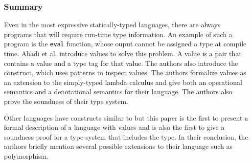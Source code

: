 \documentclass[letterpaper]{llncs}
\begin{document}
\subsubsection*{Summary}

Even in the most expressive statically-typed languages, there are always programs that will require run-time type information. An example of such a program is the \texttt{eval} function, whose ouput cannot be assigned a type at compile time. Abadi et al. introduce \Dynamic values to solve this problem. A \Dynamic value is a pair that contains a value and a type tag for that value. The authors also introduce the \typecase construct, which uses patterns to inspect \Dynamic values. The authors formalize \Dynamic values as an extension to the simply-typed lambda calculus and give both an operational semantics and a denotational semantics for their language. The authors also prove the soundness of their type system.

Other languages have constructs similar to \Dynamic but this paper is the first to present a formal description of a language with \Dynamic values and is also the first to give a soundness proof for a type system that includes the \Dynamic type. In their conclusion, the authors briefly mention several possible extensions to their language such as polymorphism.
\end{document}
